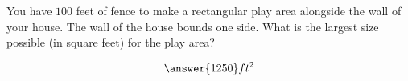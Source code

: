 \documentclass{ximera}
\author{Bart Snapp}
\begin{document}
\begin{exercise}

  You have $100$ feet of fence to make a rectangular play area
  alongside the wall of your house.  The wall of the house bounds one
  side.  What is the largest size possible (in square feet) for the
  play area?
  
  \[
  \answer{1250} ft^2
  \]
 
\end{exercise}
\end{document}
